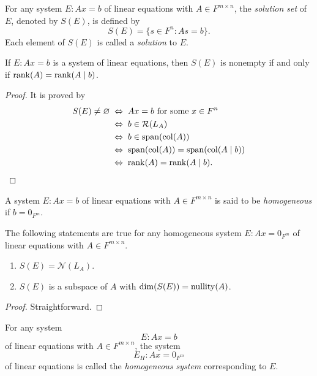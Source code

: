 \begin{definition}
  \label{def:solution-set}
  For any system $E: Ax = b$ of linear equations with $A \in F^{m \times n}$,
  the \emph{solution set} of $E$, denoted by $S(E)$, is defined by
  \begin{equation*}
    S(E) = \{s \in F^n : As = b\}.
  \end{equation*}
  Each element of $S(E)$ is called a \emph{solution} to $E$.
\end{definition}

\begin{theorem}
  \label{thm:augmented-matrix}
  If $E: Ax = b$ is a system of linear equations, then $S(E)$ is nonempty if
  and only if $\operatorname{rank}(A) = \operatorname{rank}(A \mid b)$.
\end{theorem}
\begin{proof}
  It is proved by
  \begin{align*}
    S(E) \neq \varnothing
    &\; \Leftrightarrow \; \text{$Ax = b$ for some $x \in F^n$} \\
    &\; \Leftrightarrow \; b \in \mathcal{R}(L_A) \\
    &\; \Leftrightarrow \; b \in \operatorname{span}(\operatorname{col}(A)) \\
    &\; \Leftrightarrow \; \operatorname{span}(\operatorname{col}(A)) = \operatorname{span}(\operatorname{col}(A \mid b)) \\
    &\; \Leftrightarrow \; \operatorname{rank}(A) = \operatorname{rank}(A \mid b).
    \qedhere
  \end{align*}
\end{proof}

\begin{definition}
  A system $E: Ax = b$ of linear equations with $A \in F^{m \times n}$
  is said to be \emph{homogeneous} if $b = 0_{F^m}$.
\end{definition}

\begin{proposition}
  The following statements are true for any homogeneous system
  $E: Ax = 0_{F^m}$ of linear equations with $A \in F^{m \times n}$.
  \begin{enumerate}
    \item $S(E) = \mathcal{N}(L_A)$.
    \item $S(E)$ is a subspace of $A$ with $\dim(S(E)) = \operatorname{nullity}(A)$.
  \end{enumerate}
\end{proposition}
\begin{proof}
  Straightforward.
\end{proof}

\begin{definition}
  \label{def:homogeneous-system}
  For any system
  \begin{equation*}
    E: Ax = b
  \end{equation*}
  of linear equations with $A \in F^{m \times n}$,
  the system
  \begin{equation*}
    E_H: Ax = 0_{F^m}
  \end{equation*}
  of linear equations is called the \emph{homogeneous system} corresponding to
  $E$.
\end{definition}

